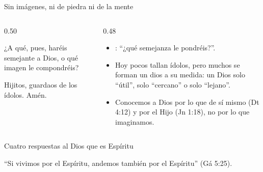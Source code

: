 \begin{frame}{Sin imágenes, ni de piedra ni de la mente}
\begin{columns}[t,onlytextwidth]
\begin{column}{0.50\textwidth}
\begin{cita}¿A qué, pues, haréis semejante a Dios, o qué imagen le compondréis?\end{cita}
\begin{cita}Hijitos, guardaos de los ídolos. Amén.\end{cita}
\end{column}
\begin{column}{0.48\textwidth}\small
\begin{itemize}
\item {}: ``¿qué semejanza le pondréis?''.
\item Hoy pocos tallan ídolos, pero muchos se forman un dios a su medida: un Dios solo ``útil'', solo ``cercano'' o solo ``lejano''.
\item Conocemos a Dios por lo que  de sí mismo (Dt 4:12) y por el Hijo (Jn 1:18), no por lo que imaginamos.
\end{itemize}
\end{column}
\end{columns}
\end{frame}

\begin{frame}{Cuatro respuestas al Dios que es Espíritu}
\centering
{}\par\medskip
\small\RaggedRight ``Si vivimos por el Espíritu, andemos también por el Espíritu'' (Gá 5:25).
\end{frame}

